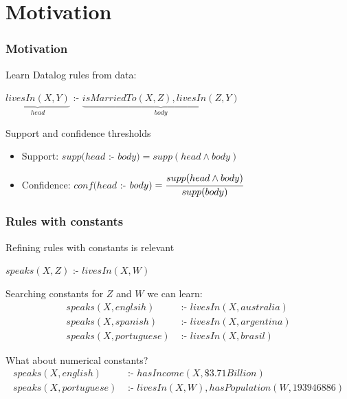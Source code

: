 \documentclass{beamer}
\begin{document}
\section{Motivation}
\begin{frame}
\frametitle{Motivation}
Learn Datalog rules from data:
\begin{center}
  $\underbrace{livesIn(X,Y)}_{head}$ :- $\underbrace{isMarriedTo(X,Z),livesIn(Z,Y)}_{body}$
\end{center}
Support and confidence thresholds
\begin{itemize}
 \item Support: $supp(head$ :- $body)=supp(head \wedge body)$
 \item Confidence: $conf(head$ :- $body)=\cfrac{supp(head \wedge body)}{supp(body)}$ 
\end{itemize}
\end{frame}
\begin{frame}
\frametitle{Rules with constants}
  Refining rules with constants is relevant
  \begin{center}
     $speaks(X,Z)$ :- $livesIn(X,W)$
  \end{center}

  Searching constants for $Z$ and $W$ we can learn:
  \begin{align*}
    speaks(X,englsih)&\text{ :- }livesIn(X,australia) \\
    speaks(X,spanish)&\text{ :- }livesIn(X,argentina) \\
    speaks(X,portuguese)&\text{ :- }livesIn(X,brasil)
  \end{align*}

  What about numerical constants?
  \begin{align*}
    speaks(X,english)&\text{ :- }hasIncome(X,\$3.71Billion) \\
    speaks(X,portuguese)&\text{ :- }livesIn(X,W),hasPopulation(W,193946886)
  \end{align*}
\end{frame}
\end{document}
